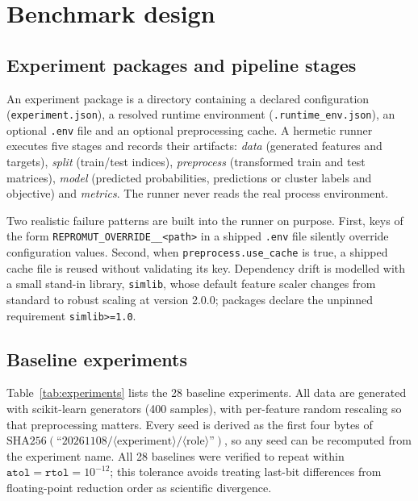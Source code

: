 \documentclass[11pt]{article}
\begin{document}
\section{Benchmark design}
\label{sec:design}

\subsection{Experiment packages and pipeline stages}

An experiment package is a directory containing a declared configuration (\texttt{experiment.json}), a resolved runtime environment (\texttt{.runtime\_env.json}), an optional \texttt{.env} file and an optional preprocessing cache. A hermetic runner executes five stages and records their artifacts: \emph{data} (generated features and targets), \emph{split} (train/test indices), \emph{preprocess} (transformed train and test matrices), \emph{model} (predicted probabilities, predictions or cluster labels and objective) and \emph{metrics}. The runner never reads the real process environment.

Two realistic failure patterns are built into the runner on purpose. First, keys of the form \texttt{REPROMUT\_OVERRIDE\_\_<path>} in a shipped \texttt{.env} file silently override configuration values. Second, when \texttt{preprocess.use\_cache} is true, a shipped cache file is reused without validating its key. Dependency drift is modelled with a small stand-in library, \texttt{simlib}, whose default feature scaler changes from standard to robust scaling at version 2.0.0; packages declare the unpinned requirement \texttt{simlib>=1.0}.

\subsection{Baseline experiments}

Table~\ref{tab:experiments} lists the 28 baseline experiments. All data are generated with scikit-learn \citep{pedregosa2011sklearn} generators (400 samples), with per-feature random rescaling so that preprocessing matters. Every seed is derived as the first four bytes of $\mathrm{SHA256}(\text{``20261108/}\langle\text{experiment}\rangle\text{/}\langle\text{role}\rangle\text{''})$, so any seed can be recomputed from the experiment name. All 28 baselines were verified to repeat within $\texttt{atol}=\texttt{rtol}=10^{-12}$; this tolerance avoids treating last-bit differences from floating-point reduction order as scientific divergence.
\end{document}
